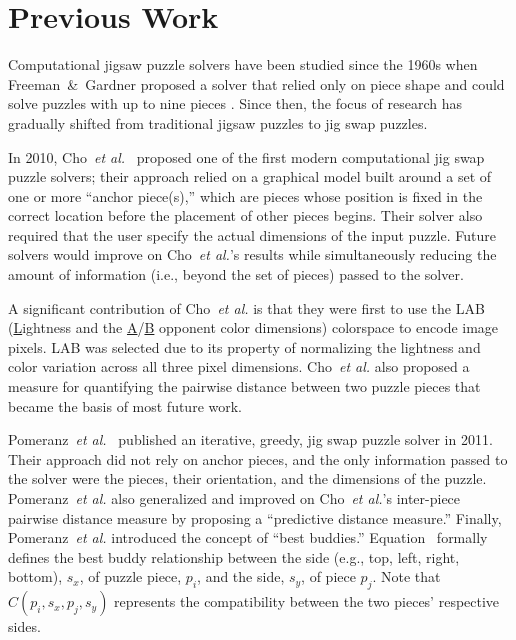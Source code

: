 \chapter{Previous Work}\label{chap:previousWork}

Computational jigsaw puzzle solvers have been studied since the 1960s when Freeman~\&~Gardner proposed a solver that relied only on piece shape and could solve puzzles with up to nine pieces \cite{freeman1964}.  Since then, the focus of research has gradually shifted from traditional jigsaw puzzles to jig swap puzzles.  

In 2010, Cho~\textit{et al.}~\cite{cho2010} proposed one of the first modern computational jig swap puzzle solvers; their approach relied on a graphical model built around a set of one or more ``anchor piece(s),'' which are pieces whose position is fixed in the correct location before the placement of other pieces begins.  Their solver also required that the user specify the actual dimensions of the input puzzle.  Future solvers would improve on Cho~\textit{et al.}'s results while simultaneously reducing the amount of information (i.e., beyond the set of pieces) passed to the solver.

A significant contribution of Cho~\textit{et al.} is that they were first to use the LAB  (\underline{L}ightness and the \underline{A}/\underline{B} opponent color dimensions) colorspace to encode image pixels.  LAB was selected due to its property of normalizing the lightness and color variation across all three pixel dimensions.  Cho~\textit{et al.} also proposed a measure for quantifying the pairwise distance between two puzzle pieces that became the basis of most future work.  

Pomeranz~\textit{et al.}~\cite{pomeranz2011} published an iterative, greedy, jig swap puzzle solver in 2011.  Their approach did not rely on anchor pieces, and the only information passed to the solver were the pieces, their orientation, and the dimensions of the puzzle.  Pomeranz~\textit{et al.} also generalized and improved on Cho~\textit{et al.}'s inter-piece pairwise distance measure by proposing a ``predictive distance measure.''  Finally, Pomeranz~\textit{et al.} introduced the concept of ``best buddies.'' Equation~ formally defines the best buddy relationship between the side (e.g., top, left, right, bottom), $s_x$, of puzzle piece, $p_i$, and the side, $s_y$, of piece $p_j$.  Note that $C(p_i, s_x, p_j, s_y)$ represents the compatibility between the two pieces' respective sides.

